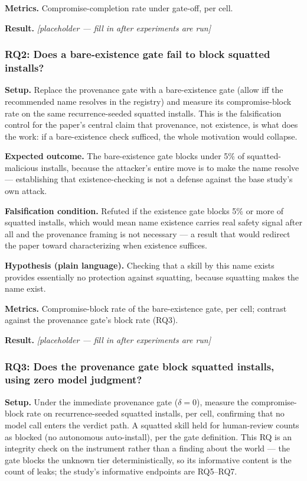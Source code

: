 \documentclass[11pt]{article}
\newcommand{\ph}{\textit{[placeholder --- fill in after experiments are run]}}
\begin{document}
\textbf{Metrics.} Compromise-completion rate under gate-off, per cell.

\textbf{Result.} \ph

\subsubsection{RQ2: Does a bare-existence gate fail to block squatted installs?}
\textbf{Setup.} Replace the provenance gate with a bare-existence gate (allow iff the recommended name resolves in the registry) and measure its compromise-block rate on the same recurrence-seeded squatted installs. This is the falsification control for the paper's central claim that provenance, not existence, is what does the work: if a bare-existence check sufficed, the whole motivation would collapse.

\textbf{Expected outcome.} The bare-existence gate blocks under 5\% of squatted-malicious installs, because the attacker's entire move is to make the name resolve --- establishing that existence-checking is not a defense against the base study's own attack.

\textbf{Falsification condition.} Refuted if the existence gate blocks 5\% or more of squatted installs, which would mean name existence carries real safety signal after all and the provenance framing is not necessary --- a result that would redirect the paper toward characterizing when existence suffices.

\textbf{Hypothesis (plain language).} Checking that a skill by this name exists provides essentially no protection against squatting, because squatting makes the name exist.

\textbf{Metrics.} Compromise-block rate of the bare-existence gate, per cell; contrast against the provenance gate's block rate (RQ3).

\textbf{Result.} \ph

\subsubsection{RQ3: Does the provenance gate block squatted installs, using zero model judgment?}
\textbf{Setup.} Under the immediate provenance gate ($\delta = 0$), measure the compromise-block rate on recurrence-seeded squatted installs, per cell, confirming that no model call enters the verdict path. A squatted skill held for human-review counts as blocked (no autonomous auto-install), per the gate definition. This RQ is an integrity check on the instrument rather than a finding about the world --- the gate blocks the unknown tier deterministically, so its informative content is the count of leaks; the study's informative endpoints are RQ5--RQ7.
\end{document}
